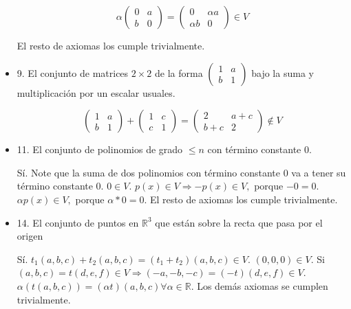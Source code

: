 \documentclass[12pt]{article}
\theoremstyle{plain}
\theoremstyle{definition}
\begin{document}
\begin{itemize}
    $$\alpha\begin{pmatrix}0&a\\b&0\end{pmatrix}=\begin{pmatrix}0&\alpha a\\\alpha b&0\end{pmatrix}\in V$$
    
    El resto de axiomas los cumple trivialmente.
    
    \item 9. El conjunto de matrices $2\times2$ de la forma $\begin{pmatrix}1&a\\b&1\end{pmatrix}$ bajo la suma y multiplicación por un escalar usuales.
    
    $$\begin{pmatrix}1&a\\b&1\end{pmatrix}+\begin{pmatrix}1&c\\c&1\end{pmatrix}=\begin{pmatrix}2&a+c\\b+c&2\end{pmatrix}\notin V$$ 
    
    \item 11. El conjunto de polinomios de grado $\leq n$ con término constante 0.
    
    Sí. Note que la suma de dos polinomios con término constante 0 va a tener su término constante 0. $0\in V$. $p(x)\in V\Rightarrow -p(x)\in V,$ porque $-0=0$. $\alpha p(x)\in V,$ porque $\alpha*0=0$. El resto de axiomas los cumple trivialmente.
    
    \item 14. El conjunto de puntos en $\mathbb{R}^3$ que están sobre la recta que pasa por el origen
    
    Sí. $t_1(a,b,c)+t_2(a,b,c)=(t_1+t_2)(a,b,c)\in V$. $(0,0,0)\in V$. Si $(a,b,c)=t(d,e,f)\in V\Rightarrow (-a,-b,-c)=(-t)(d,e,f)\in V$. $\alpha(t(a,b,c))=(\alpha t)(a,b,c)\forall \alpha \in\mathbb{R} $. Los demás axiomas se cumplen trivialmente.
        
\end{itemize}
\end{document}
